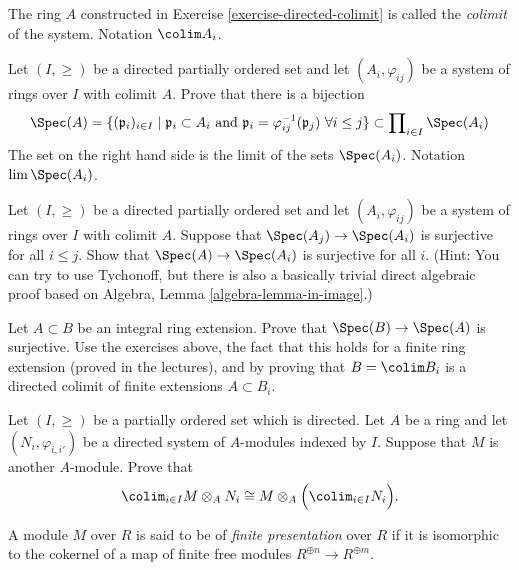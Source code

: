 \begin{definition}
\label{definition-colimit}
The ring $A$ constructed in Exercise \ref{exercise-directed-colimit}
is called the {\it colimit} of the system. Notation $\colim A_i$.
\end{definition}

\begin{exercise}
\label{exercise-prime-in-colimit}
Let $(I, \geq)$ be a directed partially ordered set and let
$(A_i, \varphi_{ij})$ be a system of rings over $I$ with colimit
$A$. Prove that there is a bijection
$$
\Spec(A) = \{(\mathfrak p_i)_{i \in I} \mid
\mathfrak p_i \subset A_i \text{ and }
\mathfrak p_i = \varphi_{ij}^{-1}(\mathfrak p_j)\ \forall i \leq j\}
\subset \prod\nolimits_{i \in I} \Spec(A_i)
$$
The set on the right hand side is the limit of the sets
$\Spec(A_i)$. Notation $\lim \Spec(A_i)$.
\end{exercise}

\begin{exercise}
\label{exercise-colimit-surjective}
Let $(I, \geq)$ be a directed partially ordered set and let
$(A_i, \varphi_{ij})$ be a system of rings over $I$ with colimit
$A$. Suppose that $\Spec(A_j) \to \Spec(A_i)$ is
surjective for all $i \leq j$. Show that
$\Spec(A) \to \Spec(A_i)$ is surjective for all $i$.
(Hint: You can try to use Tychonoff, but there is also a basically trivial
direct algebraic proof based on
Algebra, Lemma \ref{algebra-lemma-in-image}.)
\end{exercise}

\begin{exercise}
\label{exercise-integral-colimit-finite}
Let $A \subset B$ be an integral ring extension. Prove that
$\Spec(B) \to \Spec(A)$ is surjective.
Use the exercises above, the fact that this holds for a finite ring
extension (proved in the lectures), and by proving that
$B = \colim B_i$ is a directed colimit of finite extensions $A \subset B_i$.
\end{exercise}

\begin{exercise}
\label{exercise-colimit-tensor}
Let $(I, \geq)$ be a partially ordered set which is directed.
Let $A$ be a ring and let $(N_i, \varphi_{i, i'})$ be a directed system of
$A$-modules indexed by $I$. Suppose that $M$ is another $A$-module. Prove
that
$$
\colim_{i\in I} M \otimes_A N_i\cong
M \otimes_A \Big( \colim_{i\in I} N_i\Big).
$$
\end{exercise}

\begin{definition}
\label{definition-finite-presentation}
A module $M$ over $R$ is said to be of {\it finite presentation} over
$R$ if it  is isomorphic to the cokernel of a map of finite free modules
$ R^{\oplus n} \to R^{\oplus m}$.
\end{definition}


